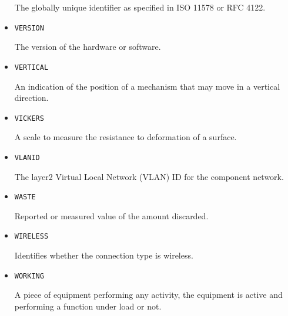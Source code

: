 \begin{itemize}
The globally unique identifier as specified in ISO 11578 or RFC 4122.


\item \texttt{VERSION}  

The version of the hardware or software.



\item \texttt{VERTICAL}  

An indication of the position of a mechanism that may move in a vertical direction.


\item \texttt{VICKERS}  

A scale to measure the resistance to deformation of a surface.


\item \texttt{VLAN\textunderscore ID}  

The layer2 Virtual Local Network (VLAN) ID for the component network.


\item \texttt{WASTE}  

Reported or measured value of the amount discarded.


\item \texttt{WIRELESS}  

Identifies whether the connection type is wireless.


\item \texttt{WORKING}  

A piece of equipment performing any activity, the equipment is active and performing a function under load or not.

\end{itemize}


